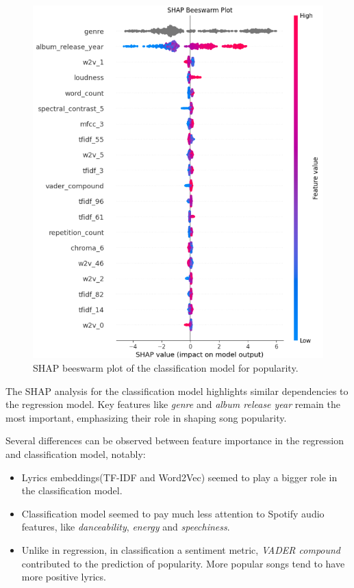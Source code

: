 \begin{center}
\begin{figure}[H]
  \centering
  \includegraphics[width=5in]{img/beeswarm_popularity_clf.png}
  \caption{SHAP beeswarm plot of the classification model for popularity.}
  \label{Figure:fig_beh}
\end{figure}
\end{center}



The SHAP analysis for the classification model highlights similar dependencies
to the regression model. Key features like \textit{genre} and
\textit{album release year} remain the most important, emphasizing their role
in shaping song popularity. 

Several differences can be observed between feature importance in the
regression and classification model, notably:
\begin{itemize}
  \item Lyrics embeddings(TF-IDF and Word2Vec) seemed to play a bigger role in
    the classification model.
  \item Classification model seemed to pay much less attention to Spotify audio
    features, like \textit{danceability}, \textit{energy} and
    \textit{speechiness}.
  \item Unlike in regression, in classification a sentiment metric,
    \textit{VADER compound} contributed to the prediction of popularity. More
    popular songs tend to have more positive lyrics.
\end{itemize}

